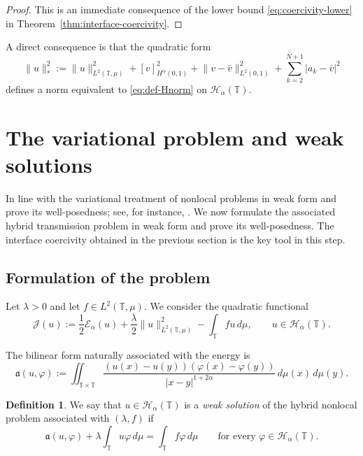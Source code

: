 \documentclass[11pt]{article}
\numberwithin{equation}{section}
\theoremstyle{definition}
\newtheorem{definition}[theorem]{Definition}
\newcommand{\T}{\mathbb{T}}
\newcommand{\EE}{\mathcal{E}}
\newcommand{\JJ}{\mathcal{J}}
\newcommand{\HH}{\mathcal{H}}
\newcommand{\ddmu}{\,d\mu}
\newcommand{\abs}[1]{\lvert#1\rvert}
\newcommand{\norm}[1]{\lVert#1\rVert}
\begin{document}
\begin{proof}
This is an immediate consequence of the lower bound \eqref{eq:coercivity-lower} in Theorem~\ref{thm:interface-coercivity}.
\end{proof}

A direct consequence is that the quadratic form
\[
\|u\|_{\ast}^2:=\|u\|_{L^2(\T,\mu)}^2+ [v]_{H^\alpha(0,1)}^2+\norm{v-\bar v}_{L^2(0,1)}^2+\sum_{k=2}^{N+1}\abs{a_k-\bar v}^2
\]
defines a norm equivalent to \eqref{eq:def-Hnorm} on $\HH_\alpha(\T)$.

\section{The variational problem and weak solutions}\label{sec:variational}
In line with the variational treatment of nonlocal problems in weak form and prove its well-posedness; see, for instance, \cite{NonlocalWeakSolutions,MRS2016,SteinbachWendland2000}. We now formulate the associated hybrid transmission problem in weak form and prove its well-posedness. The interface coercivity obtained in the previous section is the key tool in this step.
\subsection{Formulation of the problem}

Let $\lambda>0$ and let $f\in L^2(\T,\mu)$. We consider the quadratic functional
\begin{equation}\label{eq:def-functional}
\JJ(u):=\frac12\EE_\alpha(u)+\frac{\lambda}{2}\norm{u}_{L^2(\T,\mu)}^2-\int_{\T}f u\ddmu,
\qquad u\in\HH_\alpha(\T).
\end{equation}

The bilinear form naturally associated with the energy is
\begin{equation}\label{eq:def-bilinear}
\mathfrak a(u,\varphi):=
\iint_{\T\times\T}
\frac{(u(x)-u(y))(\varphi(x)-\varphi(y))}{\abs{x-y}^{1+2\alpha}}
\,d\mu(x)\,d\mu(y).
\end{equation}

\begin{definition}
We say that $u\in\HH_\alpha(\T)$ is a \emph{weak solution} of the hybrid nonlocal problem associated with $(\lambda,f)$ if
\begin{equation}\label{eq:weak-solution}
\mathfrak a(u,\varphi)+\lambda\int_{\T}u\varphi\ddmu=\int_{\T}f\varphi\ddmu
\qquad\text{for every }\varphi\in\HH_\alpha(\T).
\end{equation}
\end{definition}
\end{document}
